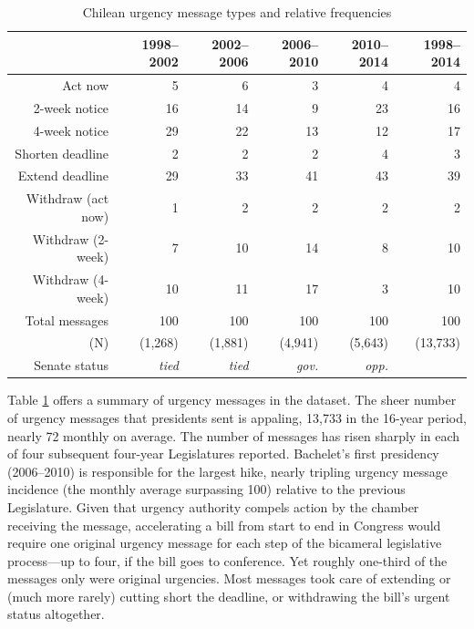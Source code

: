 \documentclass[letter,12pt]{article}
\begin{document}
\begin{table}
\centering
\begin{tabular}{rrrrr|r}
      & 1998--2002 & 2002--2006 & 2006--2010 & 2010--2014 & 1998--2014 \\ \hline
 Act now             & 5  & 6  & 3  & 4  & 4 \\ 
 2-week notice       & 16 & 14 & 9  & 23 & 16 \\ 
 4-week notice       & 29 & 22 & 13 & 12 & 17 \\ \hdashline
 Shorten deadline    & 2  & 2  & 2  & 4  &  3 \\ 
 Extend deadline     & 29 & 33 & 41 & 43 & 39 \\ \hdashline
 Withdraw (act now)  & 1  & 2  & 2  & 2  &  2 \\ 
 Withdraw (2-week)   & 7  & 10 & 14 & 8  & 10 \\ 
 Withdraw (4-week)   & 10 & 11 & 17 & 3  & 10 \\ \hline
 Total messages      & 100 & 100 & 100 & 100 & 100 \\ 
(N)                  & (1,268) & (1,881) & (4,941) & (5,643) & (13,733)\\ \hline
 Senate status       & \emph{tied} & \emph{tied} & \emph{gov.} & \emph{opp.} & \\
\end{tabular}
\caption{Chilean urgency message types and relative frequencies}\label{t:freqUrg}
\end{table}

Table \ref{t:freqUrg} offers a summary of urgency messages in the dataset. The sheer number of urgency messages that presidents sent is appaling, 13,733 in the 16-year period, nearly 72 monthly on average. The number of messages has risen sharply in each of four subsequent four-year Legislatures reported. Bachelet's first presidency (2006--2010) is responsible for the largest hike, nearly tripling urgency message incidence (the monthly average surpassing 100) relative to the previous Legislature. Given that urgency authority compels action by the chamber receiving the message, accelerating a bill from start to end in Congress would require one original urgency message for each step of the bicameral legislative process---up to four, if the bill goes to conference. Yet roughly one-third of the messages only were original urgencies. Most messages took care of extending or (much more rarely) cutting short the deadline, or withdrawing the bill's urgent status altogether. 
\end{document}
